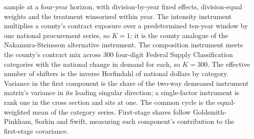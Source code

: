 \begin{table}[!htbp]
{sample at a four-year horizon, with division-by-year fixed effects, division-equal weights and
the treatment winsorized within year. The intensity instrument multiplies a county's contract
exposure over a predetermined ten-year window by one national procurement series, so $K=1$; it
is the county analogue of the Nakamura-Steinsson alternative instrument. The composition
instrument meets the county's contract mix across 300 four-digit Federal Supply Classification
categories with the national change in demand for each, so $K=300$. The effective number of
shifters is the inverse Herfindahl of national dollars by category. Variance in the first
component is the share of the two-way demeaned instrument matrix's variance in its leading
singular direction; a single-factor instrument is rank one in the cross section and sits at
one. The common cycle is the equal-weighted mean of the category series. First-stage shares
follow Goldsmith-Pinkham, Sorkin and Swift, measuring each component's contribution to the
first-stage covariance.\par}
\end{table}
